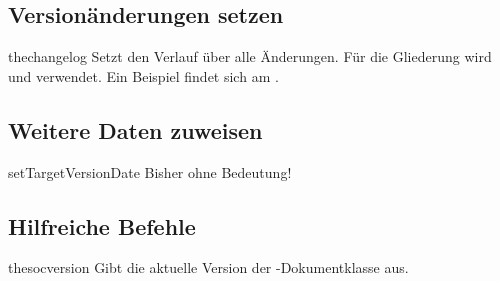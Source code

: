 \documentclass{sopra-base}
\begin{document}
\subsection{Versionänderungen setzen}

\begin{command}{thechangelog}{}
    Setzt den Verlauf über alle Änderungen. Für die Gliederung wird  und  verwendet. Ein Beispiel findet sich am .
\end{command}

\subsection{Weitere Daten zuweisen}

\begin{command}{setTargetVersionDate}{}
    Bisher ohne Bedeutung!
\end{command}


\subsection{Hilfreiche Befehle}

\begin{command}{thesocversion}{}
    Gibt die aktuelle Version der -Dokumentklasse aus. 
\end{command}

\label{mrk:docend}
\thechangelog
\end{document}
